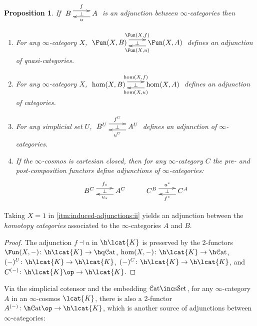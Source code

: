 \documentclass[12pt,reqno]{amsart}
\theoremstyle{plain}
\newtheorem{prop}[thm]{Proposition}
\theoremstyle{definition}
\theoremstyle{remark}
\numberwithin{equation}{subsection}
\renewcommand{\Cat}{\mathcal{C}\mathrm{at}}
\renewcommand{\sSet}{\mathrm{s}\mathcal{S}\mathrm{et}}
\renewcommand{\qCat}{\mathrm{q}\mathcal{C}\mathrm{at}}
\begin{document}
\begin{prop}\label{prop:induced-adjunctions}
If $\xymatrix{ B \ar@<1ex>[r]^f \ar@{}[r]|\perp & A \ar@<1ex>[l]^u}$ is an adjunction between $\infty$-categories then \begin{enumerate}[label=(\roman*)]
\item For any $\infty$-category $X$,  $\xymatrix{ \Fun(X,B) \ar@<1ex>[r]^{\Fun(X,f)} \ar@{}[r]|\perp & \Fun(X,A) \ar@<1ex>[l]^{\Fun(X,u)}}$ defines an adjunction of quasi-categories.
\item\label{itm:induced-adjunctions:ii} For any $\infty$-category $X$,  $\xymatrix{ \hom(X,B) \ar@<1ex>[r]^{\hom(X,f)} \ar@{}[r]|\perp & \hom(X,A) \ar@<1ex>[l]^{\hom(X,u)}}$ defines an adjunction of categories.
\item For any  simplicial set $U$,  $\xymatrix{ B^U \ar@<1ex>[r]^{ f^U} \ar@{}[r]|\perp &  A^U \ar@<1ex>[l]^{u^U}}$ defines an adjunction of $\infty$-categories.
\item If the $\infty$-cosmos is cartesian closed, then  for any $\infty$-category $C$ the pre- and post-composition functors define adjunctions of $\infty$-categories:
\[ \xymatrix{ B^C \ar@<1ex>[r]^{f_*} \ar@{}[r]|\perp & A^C \ar@<1ex>[l]^{u_*} & C^B \ar@<1ex>[r]^{u^*} \ar@{}[r]|\perp & C^A \ar@<1ex>[l]^{f^*}}\]
\end{enumerate}
\end{prop}

Taking $X = 1$ in \ref{itm:induced-adjunctions:ii} yields an adjunction between the \emph{homotopy categories} associated to the $\infty$-categories $A$ and $B$.

\begin{proof}
The adjunction $f \dashv u$ in $\h\lcat{K}$ is preserved by the 2-functors $\Fun(X,-)\colon \h\lcat{K} \to \h\qCat$, $\hom(X,-) \colon \h\lcat{K} \to \h\Cat$, $(-)^U\colon \h\lcat{K} \to \h\lcat{K}$, $(-)^C \colon \h\lcat{K} \to \h\lcat{K}$, and $C^{(-)} \colon \h\lcat{K}\op \to \h\lcat{K}$.
\end{proof}

Via the simplicial cotensor and the embedding $\Cat\inc\sSet$, for any $\infty$-category $A$ in an $\infty$-cosmos $\lcat{K}$, there is also a 2-functor $A^{(-)} \colon \h\Cat\op\to \h\lcat{K}$, which is another source of adjunctions between $\infty$-categories:
\end{document}
